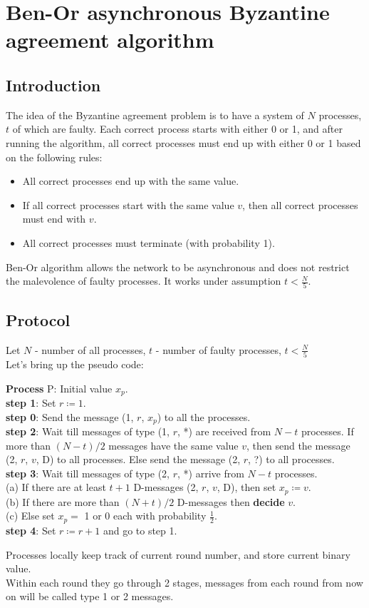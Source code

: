 \documentclass[12pt, a4paper]{article}
\begin{document}
\newtheorem{lemma}{Lemma}
\newtheorem{theorem}{Theorem}

\section*{Ben-Or asynchronous Byzantine agreement algorithm}
\subsection*{Introduction}
The idea of the Byzantine agreement problem is to have a system of $N$ processes, $t$ of which are faulty. Each correct process starts with either 0 or 1, and after running the algorithm, all correct processes must end up with either 0 or 1 based on the following rules:
\begin{itemize}
    \item All correct processes end up with the same value.
    \item If all correct processes start with the same value $v$, then all correct processes must end with $v$.
    \item All correct processes must terminate (with probability 1).
\end{itemize}
Ben-Or algorithm allows the network to be asynchronous and does not restrict the malevolence of faulty processes. It works under assumption $t<\frac{N}{5}$.
\subsection*{Protocol}
Let $N$ - number of all processes, $t$ - number of faulty processes, $t<\frac{N}{5}$\\
Let's bring up the pseudo code\cite{Ben83}:
\begin{flushleft}
\textbf{Process} P: Initial value $x_p$.\\
\textbf{step 1}: Set $r\coloneqq 1$.\\
\textbf{step 0}: Send the message (1, $r$, $x_p$) to all the
processes.\\
\textbf{step 2}: Wait till messages of type (1, $r$, *) are received from $N-t$ processes. If more than $(N-t)/2$ messages have the same value $v$, then send the message (2, $r$, $v$, D) to all processes. Else send the message (2, $r$, ?) to all processes.\\
\textbf{step 3}: Wait till messages of type (2, $r$, *) arrive from $N-t$ processes.\\
(a) If there are at least $t+1$ D-messages (2, $r$, $v$, D), then set $x_p \coloneqq v$.\\
(b) If there are more than $(N + t)/2$ D-messages then \textbf{decide} $v$.\\
(c) Else set $x_p=$ 1 or 0 each with probability $\frac{1}{2}$.\\
\textbf{step 4}: Set $r \coloneqq r + 1$ and go to step 1.
\end{flushleft}
Processes locally keep track of current round number, and store current binary value.\\
Within each round they go through 2 stages, messages from each round from now on will be called type 1 or 2 messages.
\end{document}
